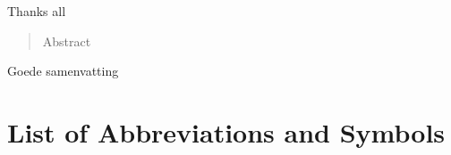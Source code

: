\documentclass[master=cws,masteroption=se,english]{kulemt}
\begin{document}
\begin{preface}
  Thanks all 
\end{preface}

\listoftodos
\tableofcontents*

\begin{abstract}
  Abstract 
\end{abstract}

\begin{abstract*}
  Goede samenvatting
\end{abstract*}

\listoffiguresandtables
\lstlistoflistings
\chapter{List of Abbreviations and Symbols}
\end{document}

